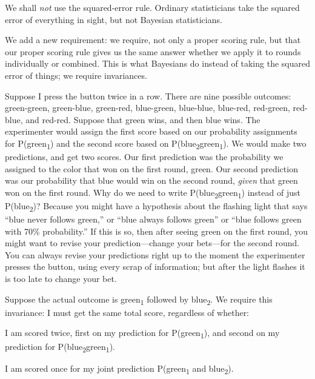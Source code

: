 {
 We shall \textit{not} use the squared-error rule. Ordinary
statisticians take the squared error of everything in sight, but not
Bayesian statisticians.}

{
 We add a new requirement: we require, not only a proper scoring
rule, but that our proper scoring rule gives us the same answer whether
we apply it to rounds individually or combined. This is what Bayesians
do instead of taking the squared error of things; we require
invariances.}

{
 Suppose I press the button twice in a row. There are nine possible
outcomes: green-green, green-blue, green-red, blue-green, blue-blue,
blue-red, red-green, red-blue, and red-red. Suppose that green wins,
and then blue wins. The experimenter would assign the first score based
on our probability assignments for P(green\textsubscript{1}) and the
second score based on
P(blue\textsubscript{2}{\textbar}green\textsubscript{1}).
We would make two predictions, and get two scores. Our first prediction
was the probability we assigned to the color that won on the first
round, green. Our second prediction was our probability that blue would
win on the second round, \textit{given} that green won on the first
round. Why do we need to write
P(blue\textsubscript{2}{\textbar}green\textsubscript{1}) instead of
just P(blue\textsubscript{2})? Because you might have a hypothesis
about the flashing light that says ``blue never
follows green,'' or ``blue always
follows green'' or ``blue follows
green with 70\% probability.'' If this is so, then
after seeing green on the first round, you might want to revise your
prediction---change your bets---for the second round. You can always
revise your predictions right up to the moment the experimenter presses
the button, using every scrap of information; but after the light
flashes it is too late to change your bet.}

{
 Suppose the actual outcome is green\textsubscript{1} followed by
blue\textsubscript{2}. We require this invariance: I must get the same
total score, regardless of whether:}

{
 I am scored twice, first on my prediction for
P(green\textsubscript{1}), and second on my prediction for
P(blue\textsubscript{2}{\textbar}green\textsubscript{1}).}

{
 I am scored once for my joint prediction P(green\textsubscript{1}
and blue\textsubscript{2}).}

